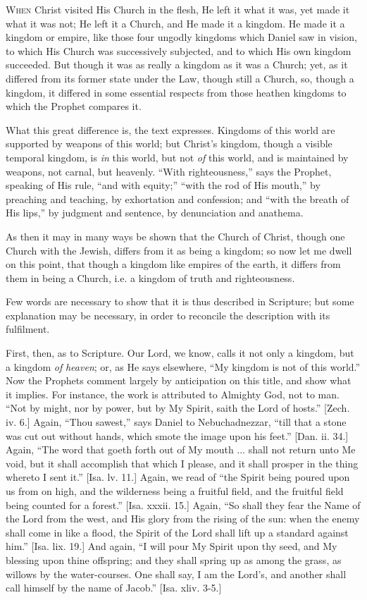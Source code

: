 W\textsc{hen} Christ visited His Church in the flesh, He left it what it
was, yet made it what it was not; He left it a Church, and He made it
a kingdom. He made it a kingdom or empire, like those four ungodly
kingdoms which Daniel saw in vision, to which His Church was
successively subjected, and to which His own kingdom succeeded. But
though it was as really a kingdom as it was a Church; yet, as it
differed from its former state under the Law, though still a Church,
so, though a kingdom, it differed in some essential respects from
those heathen kingdoms to which the Prophet compares it.

What this great difference is, the text expresses. Kingdoms of this
world are supported by weapons of this world; but Christ's kingdom,
though a visible temporal kingdom, is \emph{in} this world, but not \emph{of}
this world, and is maintained by weapons, not carnal, but heavenly.
``With righteousness,'' says the Prophet, speaking of His
rule, ``and with equity;'' ``with the rod of His
mouth,'' by preaching and teaching, by exhortation and confession;
and ``with the breath of His lips,'' by judgment and sentence,
by denunciation and anathema.

As then it may in many ways be shown that the Church of Christ,
though one Church with the Jewish, differs from it as being a kingdom;
so now let me dwell on this point, that though a kingdom like empires
of the earth, it differs from them in being a Church, i.e. a kingdom
of truth and righteousness.

Few words are necessary to show that it is thus described in
Scripture; but some explanation may be necessary, in order to
reconcile the description with its fulfilment.

First, then, as to Scripture. Our Lord, we know, calls it not only
a kingdom, but a kingdom \emph{of} \emph{heaven}; or, as He says
elsewhere, ``My kingdom is not of this world.'' Now the
Prophets comment largely by anticipation on this title, and show what
it implies. For instance, the work is attributed to Almighty God, not
to man. ``Not by might, nor by power, but by My Spirit, saith the
Lord of hosts.'' [Zech. iv. 6.] Again, ``Thou sawest,''
says Daniel to Nebuchadnezzar, ``till that a stone was cut out
without hands, which smote the image upon his feet.'' [Dan. ii.
34.] Again, ``The word that goeth forth out of My mouth ... shall
not return unto Me void, but it shall accomplish that which I please,
and it shall prosper in the thing whereto I sent it.'' [Isa. lv.
11.] Again, we read of ``the Spirit being poured upon us from on
high, and the wilderness being a fruitful field, and the fruitful
field being counted for a forest.'' [Isa. xxxii. 15.] Again,
``So shall they fear the Name of the Lord from the west, and His
glory from the rising of the sun: when the enemy shall come in like a
flood, the Spirit of the Lord shall lift up a standard against
him.'' [Isa. lix. 19.] And again, ``I will pour My Spirit upon
thy seed, and My blessing upon thine offspring; and they shall spring
up as among the grass, as willows by the water-courses. One shall say,
I am the Lord's, and another shall call himself by the name of
Jacob.'' [Isa. xliv. 3-5.]

